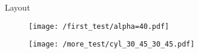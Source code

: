 \documentclass[aspectratio=169,xcolor=dvipsnames]{beamer}
\begin{document}
\begin{frame}{Layout}
	
\begin{figure}

\begin{minipage}{0.35\textwidth}
	
	\begin{minipage}{0.45\textwidth}
	\tiny{	\def\svgwidth{\linewidth}
		}
	\end{minipage}\hfill
	\begin{minipage}{0.45\textwidth}
		\tiny{	\def\svgwidth{\textwidth}
		}
	\end{minipage}\hfill
	\begin{minipage}{0.45\textwidth}
		\tiny{	\def\svgwidth{\textwidth}
		}
	\end{minipage}\hfill
	\begin{minipage}{0.45\textwidth}
		\tiny{	\def\svgwidth{\textwidth}
		}
	\end{minipage}\hfill
\end{minipage}\hspace{0.07\linewidth}
\begin{minipage}{0.55\textwidth}
	\begin{minipage}{0.45\textwidth}
			\centering
	\end{minipage}\hfill
	\begin{minipage}{0.45\textwidth}
		\texttt{[image: /first\_test/alpha=40.pdf]}
	\end{minipage}\hfill
	\begin{minipage}{0.45\textwidth}
	\end{minipage}\hfill
	\begin{minipage}{0.45\textwidth}
		\texttt{[image: /more\_test/cyl\_30\_45\_30\_45.pdf]}
	\end{minipage}
\end{minipage}\hfill

\end{figure}
\end{frame}
\end{document}
